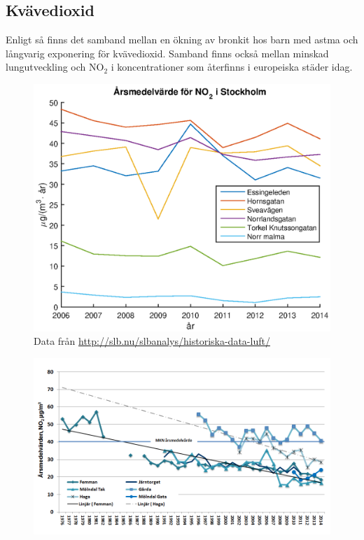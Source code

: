\subsection{Kvävedioxid}
Enligt \cite{whoAir} så finns det samband mellan en ökning av bronkit hos barn med astma och långvarig exponering för kvävedioxid. Samband finns också mellan minskad lungutveckling och NO$_2$ i koncentrationer som återfinns i europeiska städer idag.
\begin{figure}[H]
	\centering
	\includegraphics[width=.8\textwidth]{Bilder/NO2sth}
	\caption{Data från \url{http://slb.nu/slbanalys/historiska-data-luft/}}
	\label{fig:NO2sth}
\end{figure}

\begin{figure}[H]
	\centering
	\includegraphics[width=.8\textwidth]{Bilder/NO2gbg}
	\caption{\cite{gbg}}
	\label{fig:NO2gbg}
\end{figure}
